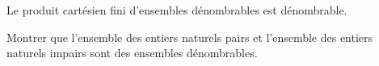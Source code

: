 \documentclass[a4paper,10pt]{report}
\begin{document}
\newpage

$\phantom{test}$

\vspace{6cm}

\begin{Proposition}{} Le produit cartésien fini d'ensembles dénombrables est dénombrable.
\end{Proposition} 

\begin{Demonstration}{}

\vspace{6cm}
\end{Demonstration}




\begin{ApplicationDirecte} Montrer que l'ensemble des entiers naturels pairs et l'ensemble des entiers naturels impairs sont des ensembles dénombrables.
\end{ApplicationDirecte}
\end{document}
